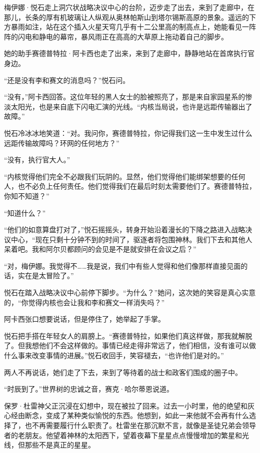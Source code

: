 \documentclass[AutoFakeBold=true]{book}
\begin{document}
\vspace*{1em}

梅伊娜·悦石走上洞穴状战略决议中心的台阶，迈步走了出去，来到了走廊中，在那儿，长条的厚有机玻璃让人纵观从奥林帕斯山到塔尔锡斯高原的景象。遥远的下方暴雨如注，站在这个插入火星天穹几乎有十二公里高的制高点上，她能看见一阵阵的闪电和静电的幕帘，暴风雨正在高高的大草原上拖动着自己的脚步。

她的助手赛德普特拉·阿卡西也走了出来，来到了走廊中，静静地站在首席执行官身边。

``还是没有李和赛文的消息吗？''悦石问。

``没有，''阿卡西回答。这位年轻的黑人女士的脸被照亮了，那是来自家园星系的惨淡太阳光，也是来自底下闪电汇演的光线。``内核当局说，也许是远距传输器出了故障。''

悦石冷冰冰地笑道：``对。我问你，赛德普特拉，你记得我们这一生中发生过什么远距传输故障吗？环网的任何地方？''

``没有，执行官大人。''

``内核觉得他们完全不必跟我们玩阴的。显然，他们觉得他们能绑架想要的任何人，也不必负上任何责任。他们觉得我们在最后时刻太需要他们了。赛德普特拉，你知不知道？''

``知道什么？''

``他们的如意算盘打对了，''悦石摇摇头，转身开始沿着漫长的下降之路进入战略决议中心，``现在只剩十分钟不到的时间了，驱逐者将包围神林。我们下去和其他人呆着吧。我和阿尔贝都顾问的会见是不是就安排在会议之后？''

``对，梅伊娜。我觉得不……我是说，我们中有些人觉得和他们像那样直接见面的话，实在是太冒险了。''

悦石在踏入战略决议中心前停下脚步。``为什么？''她问，这次她的笑容是真心实意的，``你觉得内核也会让我和李和赛文一样消失吗？''

阿卡西张口想要说话，但是停住了，她举起了手掌。

悦石把手搭在年轻女人的肩膀上。``赛德普特拉，如果他们真这样做，那我就解脱了。但我想他们不会这样做的。事情已经走得非常远了，他们相信，没有谁可以做什么事来改变事情的进展。''悦石收回手，笑容褪去，``也许他们是对的。''

两人不再说话，她们走了下去，来到了等待着的战士和政客们围成的圈子中。

\vspace*{1em}

``时辰到了。''世界树的忠诚之音，赛克·哈尔蒂恩说道。

保罗·杜雷神父正沉浸在幻想中，现在被拉了回来。过去一小时里，他的绝望和灰心经由断念，变成了某种类似愉悦的东西。他想到，如此一来他就不会再有什么选择了，也不再需要履行什么职责了。杜雷坐在那沉默不言，就像是圣徒兄弟会领导者的老朋友。他望着神林的太阳西下，望着夜幕下星星点点慢慢增加的繁星和光线，但那些不是真正的星星。
\end{document}
